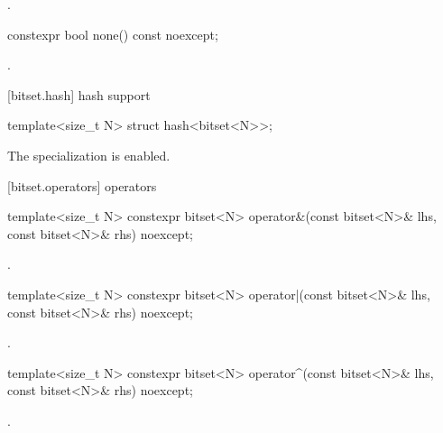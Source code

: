 \begin{itemdescr}
\pnum
\returns
{}.
\end{itemdescr}

%
\begin{itemdecl}
constexpr bool none() const noexcept;
\end{itemdecl}

\begin{itemdescr}
\pnum
\returns
{}.
\end{itemdescr}

[bitset.hash]{ hash support}

%
\begin{itemdecl}
template<size_t N> struct hash<bitset<N>>;
\end{itemdecl}

\begin{itemdescr}
\pnum
The specialization is enabled.
\end{itemdescr}


[bitset.operators]{ operators}

%
\begin{itemdecl}
template<size_t N>
  constexpr bitset<N> operator&(const bitset<N>& lhs, const bitset<N>& rhs) noexcept;
\end{itemdecl}

\begin{itemdescr}
\pnum
\returns
{}.
\end{itemdescr}

%
\begin{itemdecl}
template<size_t N>
  constexpr bitset<N> operator|(const bitset<N>& lhs, const bitset<N>& rhs) noexcept;
\end{itemdecl}

\begin{itemdescr}
\pnum
\returns
{}.
\end{itemdescr}

%
\begin{itemdecl}
template<size_t N>
  constexpr bitset<N> operator^(const bitset<N>& lhs, const bitset<N>& rhs) noexcept;
\end{itemdecl}

\begin{itemdescr}
\pnum
\returns
{}.
\end{itemdescr}

